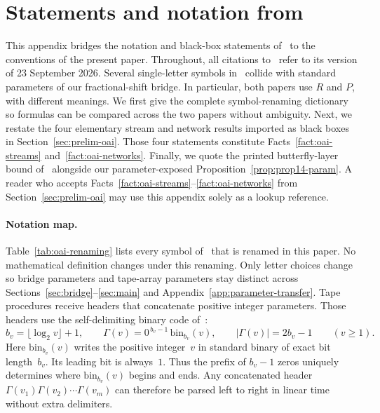 \section{Statements and notation from \texorpdfstring{\cite{OAI26}}{[OAI26]}}\label{app:oai}

This appendix bridges the notation and black-box statements of~\cite{OAI26} to the conventions of the present paper. Throughout, all citations to~\cite{OAI26} refer to its version of 23 September 2026. Several single-letter symbols in~\cite{OAI26} collide with standard parameters of our fractional-shift bridge. In particular, both papers use $R$ and $P$, with different meanings. We first give the complete symbol-renaming dictionary so formulas can be compared across the two papers without ambiguity. Next, we restate the four elementary stream and network results imported as black boxes in Section~\ref{sec:prelim-oai}. Those four statements constitute Facts~\ref{fact:oai-streams} and~\ref{fact:oai-networks}. Finally, we quote the printed butterfly-layer bound of~\cite[Prop.~14]{OAI26} alongside our parameter-exposed Proposition~\ref{prop:prop14-param}. A reader who accepts Facts~\ref{fact:oai-streams}--\ref{fact:oai-networks} from Section~\ref{sec:prelim-oai} may use this appendix solely as a lookup reference.

\paragraph{Notation map.}
Table~\ref{tab:oai-renaming} lists every symbol of~\cite{OAI26} that is renamed in this paper. No mathematical definition changes under this renaming. Only letter choices change so bridge parameters and tape-array parameters stay distinct across Sections~\ref{sec:bridge}--\ref{sec:main} and Appendix~\ref{app:parameter-transfer}. Tape procedures receive headers that concatenate positive integer parameters. Those headers use the self-delimiting binary code of~\cite[(1)]{OAI26}:
\begin{equation}\label{eq:oai-gamma}
  b_v=\lfloor\log_2v\rfloor+1,\qquad \Gamma(v)=0^{\,b_v-1}\,\mathrm{bin}_{b_v}(v),\qquad |\Gamma(v)|=2b_v-1
  \qquad(v\ge1).
\end{equation}
Here $\mathrm{bin}_{b_v}(v)$ writes the positive integer~$v$ in standard binary of exact bit length~$b_v$. Its leading bit is always~$1$. Thus the prefix of $b_v-1$ zeros uniquely determines where $\mathrm{bin}_{b_v}(v)$ begins and ends. Any concatenated header $\Gamma(v_1)\Gamma(v_2)\cdots\Gamma(v_m)$ can therefore be parsed left to right in linear time without extra delimiters.

